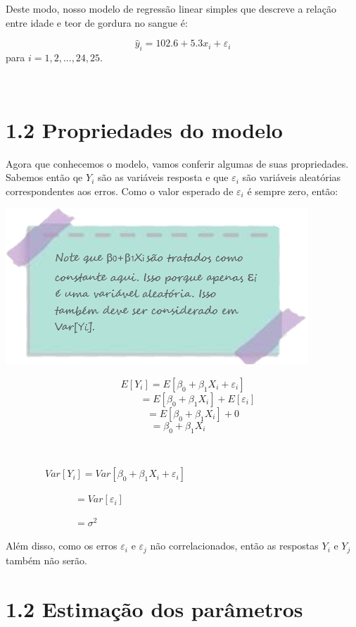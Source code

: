 \documentclass[
]{article}
\begin{document}
Deste modo, nosso modelo de regressão linear simples que descreve a
relação entre idade e teor de gordura no sangue é:

\[\hat{y}_i = 102.6 + 5.3x_i+\varepsilon_i\] para \(i=1,2,...,24,25\).

~

\hypertarget{propriedades-do-modelo}{%
\section{1.2 Propriedades do modelo}\label{propriedades-do-modelo}}

Agora que conhecemos o modelo, vamos conferir algumas de suas
propriedades. Sabemos então qe \(Y_i\) são as variáveis resposta e que
\(\varepsilon_i\) são variáveis aleatórias correspondentes aos erros.
Como o valor esperado de \(\varepsilon_i\) é sempre zero, então:

\includegraphics{images/note5.png}

\[E[Y_i]=E[\beta_0+\beta_1X_i+\varepsilon_i]\]
\[\qquad\quad=E[\beta_0+\beta_1X_i]+E[\varepsilon_i]\]
\[\qquad\quad=E[\beta_0+\beta_1X_i]+0\quad\]
\[\qquad=\beta_0+\beta_1X_i\quad\qquad\]

~

\(\qquad\qquad Var[Y_i]=Var[\beta_0+\beta_1X_i+\varepsilon_i]\)

\(\qquad\qquad\qquad\quad = Var[\varepsilon_i]\qquad\qquad\)

\(\qquad\qquad\qquad\quad = \sigma^2\qquad\qquad\)

Além disso, como os erros \(\varepsilon_i\) e \(\varepsilon_j\) não
correlacionados, então as respostas \(Y_i\) e \(Y_j\) também não serão.

\hypertarget{estimauxe7uxe3o-dos-paruxe2metros}{%
\section{1.2 Estimação dos
parâmetros}\label{estimauxe7uxe3o-dos-paruxe2metros}}
\end{document}
